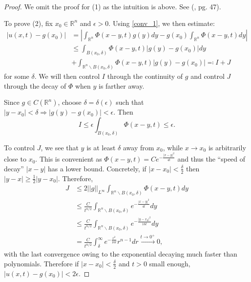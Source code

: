 \documentclass[openany, amssymb, psamsfonts]{amsart}
\theoremstyle{definition}
\numberwithin{equation}{section}
\newcommand{\bbr}{\mathbb{R}}
\let\implies\Rightarrow
\begin{document}
\begin{proof}
    We omit the proof for (1) as the intuition is above. See (\cite{Evans}, pg. 47).

    To prove (2), fix $x_0 \in \bbr^n$ and $\epsilon > 0$. Using \autoref{conv_1}, we then estimate:
    \begin{align*}
        |u(x, t) - g(x_0)| &= |\int_{\bbr^n} \Phi(x-y, t) g(y) dy - g(x_0) \int_{\bbr^n} \Phi(x-y, t) dy| \\
        &\leq \int_{B(x_0, \delta)} \Phi(x-y, t) |g(y) - g(x_0)| dy \\
        &+ \int_{\bbr^n \backslash B(x_0, \delta)} \Phi(x-y, t) |g(y) - g(x_0)| \eqqcolon I + J
    \end{align*}
    for some $\delta$. We will then control $I$ through the continuity of $g$ and control $J$ through the decay of $\Phi$ when $y$ is farther away.

    Since $g \in C(\bbr^n)$, choose $\delta = \delta(\epsilon)$ such that $|y- x_0| < \delta \implies |g(y) - g(x_0)| < \epsilon$. Then \[
    I \leq \epsilon \int_{B(x_0, \delta)} \Phi(x-y, t) \leq \epsilon .
    \]

    To control $J$, we see that $y$ is at least $\delta$ away from $x_0$, while $x \to x_0$ is arbitrarily close to $x_0$. This is convenient as $\Phi(x-y, t) = C e^{-\frac{|x-y|^2}{4t}}$ and thus the ``speed of decay'' $|x - y|$ has a lower bound. Concretely, if $|x - x_0| < \frac{\delta}{2}$ then $|y-x| \geq \frac{1}{2} |y - x_0|$. Therefore,
    \begin{align*}
    J &\leq 2 ||g||_{L^\infty} \int_{\bbr^n \backslash B(x_0, \delta)} \Phi(x-y, t) dy \\
    &\leq \frac{C}{t^{n/2}}  \int_{\bbr^n \backslash B(x_0, \delta)} e^{-\frac{|x-y|^2}{4t}} dy \\
    &\leq \frac{C}{t^{n/2}}  \int_{\bbr^n \backslash B(x_0, \delta)} e^{-\frac{|y-x_0|^2}{16t}} dy \\
    &= \frac{C}{t^{n/2}} \int_{\delta}^{\infty} e^{-\frac{r^2}{16t}} r^{n-1} dr \xrightarrow{t \to 0^+} 0 ,
    \end{align*}
    with the last convergence owing to the exponential decaying much faster than polynomials. Therefore if $|x-x_0| < \frac{\delta}{2}$ and $t>0$ small enough, $|u(x, t) - g(x_0)| < 2\epsilon$.
\end{proof}
\end{document}
